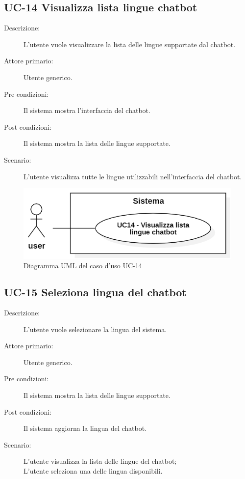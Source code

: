 \subsection{UC-14 Visualizza lista lingue chatbot}
\begin{description}
    \item[Descrizione:] L'utente vuole visualizzare la lista delle lingue supportate dal chatbot.
    \item[Attore primario:] Utente generico.
    \item[Pre condizioni:] Il sistema mostra l'interfaccia del chatbot.
    \item[Post condizioni:] Il sistema mostra la lista delle lingue supportate.
    \item[Scenario:] L'utente visualizza tutte le lingue utilizzabili nell'interfaccia del chatbot.
\end{description}

\begin{figure}[H]
    \centering
    \includegraphics[width=0.8\linewidth]{UC14.png}
    \caption{Diagramma UML del caso d'uso UC-14}
    \label{fig:UC14}
\end{figure}

\subsection{UC-15 Seleziona lingua del chatbot}
\begin{description}
    \item[Descrizione:] L'utente vuole selezionare la lingua del sistema.
    \item[Attore primario:] Utente generico.
    \item[Pre condizioni:] Il sistema mostra la lista delle lingue supportate.
    \item[Post condizioni:] Il sistema aggiorna la lingua del chatbot.
    \item[Scenario:] L'utente visualizza la lista delle lingue del chatbot;\\L'utente seleziona una delle lingua disponibili.
\end{description}

